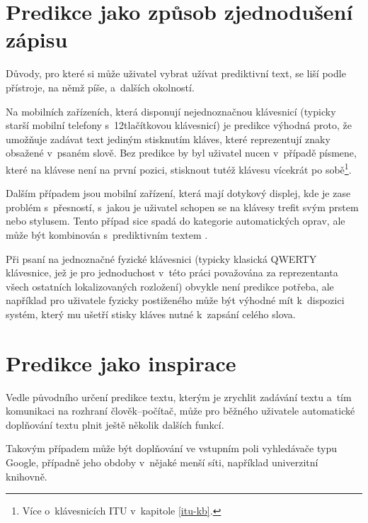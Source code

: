 \documentclass[a4paper,11pt,openany]{book} %
\begin{document}
\section{Predikce jako způsob zjednodušení zápisu}

Důvody, pro které si může uživatel vybrat užívat prediktivní text, se liší podle přístroje, na němž píše, a~dalších okolností.

Na mobilních zařízeních, která disponují nejednoznačnou klávesnicí (typicky starší mobilní telefony s~12tlačítkovou klávesnicí) je predikce výhodná proto, že umožňuje zadávat text jediným stisknutím kláves, které reprezentují znaky obsažené v~psaném slově. Bez predikce by byl uživatel nucen v~případě písmene, které na klávese není na první pozici, stisknout tutéž klávesu vícekrát po sobě\footnote{Více o~klávesnicích ITU v~kapitole \ref{itu-kb}.}.

Dalším případem jsou mobilní zařízení, která mají dotykový displej, kde je zase problém s~přesností, s~jakou je uživatel schopen se na klávesy trefit svým prstem nebo stylusem. Tento případ sice spadá do kategorie automatických oprav, ale může být kombinován s~prediktivním textem \parencite{kocienda2012method}. %

Při psaní na jednoznačné fyzické klávesnici (typicky klasická QWERTY klávesnice, jež je pro jednoduchost v~této práci považována za reprezentanta všech ostatních lokalizovaných rozložení) obvykle není predikce potřeba, ale například pro uživatele fyzicky postiženého může být výhodné mít k~dispozici systém, který mu ušetří stisky kláves nutné k~zapsání celého slova.

\section{Predikce jako inspirace}

Vedle původního určení predikce textu, kterým je zrychlit zadávání textu a~tím komunikaci na rozhraní člověk--počítač, může pro běžného uživatele automatické doplňování textu plnit ještě několik dalších funkcí.

Takovým případem může být doplňování ve vstupním poli vyhledávače typu Google, případně jeho obdoby v~nějaké menší síti, například univerzitní knihovně. \parencite{google2015}
\end{document}

